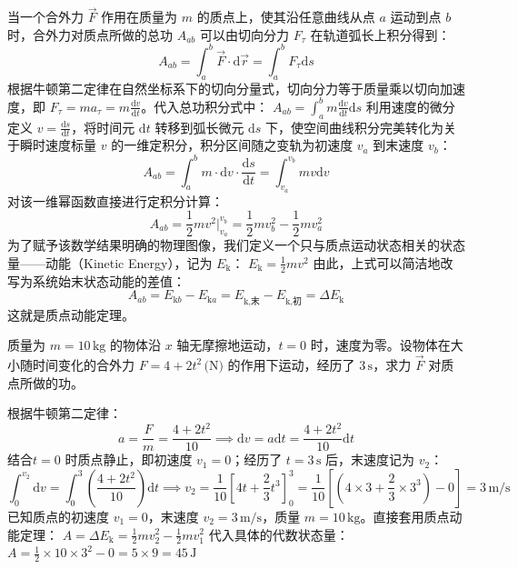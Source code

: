 \begin{theorem}[质点动能定理]
当一个合外力 $\vec{F}$ 作用在质量为 $m$ 的质点上，使其沿任意曲线从点 $a$ 运动到点 $b$ 时，合外力对质点所做的总功 $A_{ab}$ 可以由切向分力 $F_\tau$ 在轨道弧长上积分得到：$$A_{ab} = \int_{a}^{b} \vec{F} \cdot \mathrm{d}\vec{r} = \int_{a}^{b} F_\tau \mathrm{d}s$$根据牛顿第二定律在自然坐标系下的切向分量式，切向分力等于质量乘以切向加速度，即 $F_\tau = ma_\tau = m\frac{\mathrm{d}v}{\mathrm{d}t}$。代入总功积分式中： \(A_{ab} = \int_{a}^{b} m\frac{\mathrm{d}v}{\mathrm{d}t} \mathrm{d}s\) 利用速度的微分定义 $v = \frac{\mathrm{d}s}{\mathrm{d}t}$，将时间元 $\mathrm{d}t$ 转移到弧长微元 $\mathrm{d}s$ 下，使空间曲线积分完美转化为关于瞬时速度标量 $v$ 的一维定积分，积分区间随之变轨为初速度 $v_a$ 到末速度 $v_b$：$$A_{ab} = \int_{a}^{b} m \cdot \mathrm{d}v \cdot \frac{\mathrm{d}s}{\mathrm{d}t} = \int_{v_a}^{v_b} mv \mathrm{d}v$$对该一维幂函数直接进行定积分计算：$$A_{ab} = \frac{1}{2}mv^2 \Big|_{v_a}^{v_b} = \frac{1}{2}mv_b^2 - \frac{1}{2}mv_a^2$$为了赋予该数学结果明确的物理图像，我们定义一个只与质点运动状态相关的状态量——动能（Kinetic Energy），记为 $E_{\text{k}}$： \(E_{\text{k}} = \frac{1}{2}mv^2\) 由此，上式可以简洁地改写为系统始末状态动能的差值：$$A_{ab} = E_{\text{k}b} - E_{\text{k}a} = E_{\text{k,末}} - E_{\text{k,初}} = \Delta E_{\text{k}}$$这就是质点动能定理。
\end{theorem}

\begin{exercise}
质量为 $m = 10\,\text{kg}$ 的物体沿 $x$ 轴无摩擦地运动，$t = 0$ 时，速度为零。设物体在大小随时间变化的合外力 $F = 4 + 2t^2\,\text{(N)}$ 的作用下运动，经历了 $3\,\text{s}$，求力 $\vec{F}$ 对质点所做的功。
\end{exercise}
\begin{solution}
根据牛顿第二定律：$$a = \frac{F}{m} = \frac{4 + 2t^2}{10}\implies\mathrm{d}v = a\mathrm{d}t = \frac{4 + 2t^2}{10}\mathrm{d}t$$结合$t = 0$ 时质点静止，即初速度 $v_1 = 0$；经历了 $t = 3\,\text{s}$ 后，末速度记为 $v_2$：
$$\int_{0}^{v_2} \mathrm{d}v = \int_{0}^{3} \left( \frac{4 + 2t^2}{10} \right) \mathrm{d}t\implies v_2 = \frac{1}{10} \left[ 4t + \frac{2}{3}t^3 \right]_0^3= \frac{1}{10} \left[ \left(4 \times 3 + \frac{2}{3} \times 3^3\right) - 0 \right] = 3\,\text{m/s}$$
已知质点的初速度 $v_1 = 0$，末速度 $v_2 = 3\,\text{m/s}$，质量 $m = 10\,\text{kg}$。直接套用质点动能定理： \(A = \Delta E_{\text{k}} = \frac{1}{2}mv_2^2 - \frac{1}{2}mv_1^2\) 代入具体的代数状态量： \(A = \frac{1}{2} \times 10 \times 3^2 - 0 = 5 \times 9 = 45\,\text{J}\) 
\end{solution}

